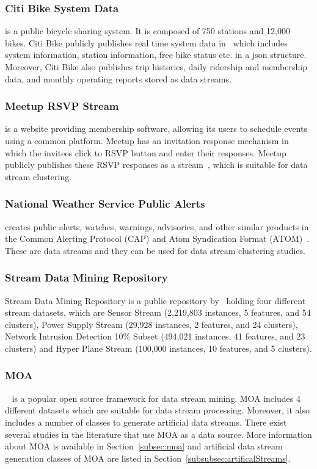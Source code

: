 \documentclass[smallcondensed]{svjour3}     %
\begin{document}
\subsubsection{Citi Bike System Data}
\label{subsubsec:citibike}
\citet{CitiBike} is a public bicycle sharing system. It is composed of 750 stations and 12,000 bikes. Citi Bike publicly publishes real time system data in~\citeauthor{CitiBike:SystemData} which includes system information, station information, free bike status etc. in a json structure. Moreover, Citi Bike also publishes trip histories, daily ridership and membership data, and monthly operating reports stored as data streams.

\subsubsection{Meetup RSVP Stream}
\label{subsubsec:meetup}
\citet{Meetup} is a website providing membership software, allowing its users to schedule events using a common platform. Meetup has an invitation response mechanism in which the invitees click to RSVP button and enter their responses. Meetup publicly publishes these RSVP responses as a stream~\citep{Meetup:RSVP}, which is suitable for data stream clustering.

\subsubsection{National Weather Service Public Alerts}
\label{subsubsec:nationalweather}
\citet{NWS} creates public alerts, watches, warnings, advisories, and other similar products in the Common Alerting Protocol (CAP) and Atom Syndication Format (ATOM)~\citep{NWS:alerts}. These are data streams and they can be used for data stream clustering studies.
	
\subsubsection{Stream Data Mining Repository}
\label{subsubsec:StreamDataMinngRepo}
Stream Data Mining Repository is a public repository by~\citet{StreamDataRepo} holding four different stream datasets, which are Sensor Stream (2,219,803 instances, 5 features, and 54 clusters), Power Supply Stream (29,928 instances, 2 features, and 24 clusters), Network Intrusion Detection 10\% Subset (494,021 instances, 41 features, and 23 clusters) and Hyper Plane Stream (100,000 instances, 10 features, and 5 clusters).

\subsubsection{MOA}
\label{subsubsec:moa}
\citeauthor{Moa}~\citep{Bifet:MOA} is a popular open source framework for data stream mining. MOA includes 4 different datasets which are suitable for data stream processing. Moreover, it also includes a number of classes to generate artificial data streams. There exist several studies in the literature that use MOA as a data source. More information about MOA is available in Section~\ref{subsec:moa} and artificial data stream generation classes of MOA are listed in Section~\ref{subsubsec:artificalStreams}.
\end{document}

